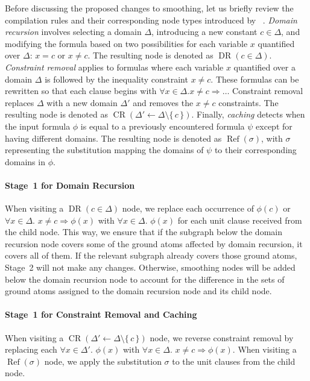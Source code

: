 \documentclass[letterpaper]{article} %
\theoremstyle{remark}
\theoremstyle{definition}
\DeclareMathOperator{\CR}{CR}
\DeclareMathOperator{\DR}{DR}
\DeclareMathOperator{\Reff}{Ref}
\begin{document}
Before discussing the proposed changes to smoothing, let us briefly review the
compilation rules and their corresponding node types introduced by
\citeauthor{DBLP:conf/kr/DilkasB23}~.
\emph{Domain recursion} involves selecting a domain $\Delta$, introducing a new
constant $c \in \Delta$, and modifying the formula based on two possibilities
for each variable $x$ quantified over $\Delta$: $x = c$ or $x \ne c$. The
resulting node is denoted as $\DR(c \in \Delta)$. \emph{Constraint removal}
applies to formulas where each variable $x$ quantified over a domain $\Delta$ is
followed by the inequality constraint $x \ne c$. These formulas can be rewritten
so that each clause begins with $\forall x \in \Delta\text{.
}x \ne c \Rightarrow \ldots$ Constraint removal replaces $\Delta$ with a new
domain $\Delta'$ and removes the $x \ne c$ constraints. The resulting node is
denoted as $\CR(\Delta' \gets \Delta \setminus \{\,c\,\})$. Finally,
\emph{caching} detects when the input formula $\phi$ is equal to a previously
encountered formula $\psi$ except for having different domains. The resulting
node is denoted as $\Reff(\sigma)$, with $\sigma$ representing the substitution
mapping the domains of $\psi$ to their corresponding domains in $\phi$.

\paragraph{Stage~1 for Domain Recursion}
When visiting a $\DR(c \in \Delta)$ node, we replace each occurrence of
$\phi(c)$ or $\forall x \in \Delta\text{. } x \ne c \Rightarrow \phi(x)$ with
$\forall x \in \Delta\text{. }\phi(x)$ for each unit clause received from the
child node. This way, we ensure that if the subgraph below the domain recursion
node covers some of the ground atoms affected by domain recursion, it covers all
of them. If the relevant subgraph already covers those ground atoms, Stage~2
will not make any changes. Otherwise, smoothing nodes will be added below the
domain recursion node to account for the difference in the sets of ground atoms
assigned to the domain recursion node and its child node.

\paragraph{Stage~1 for Constraint Removal and Caching}
When visiting a $\CR(\Delta' \gets \Delta \setminus \{\,c\,\})$ node, we reverse
constraint removal by replacing each $\forall x \in \Delta'\text{. }\phi(x)$
with $\forall x \in \Delta\text{. }x \ne c \Rightarrow \phi(x)$. When visiting a
$\Reff(\sigma)$ node, we apply the substitution $\sigma$ to the unit clauses
from the child node.
\end{document}
